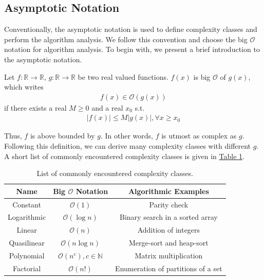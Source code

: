 \subsection{Asymptotic Notation}
Conventionally, the asymptotic notation is used to define complexity classes and perform the algorithm analysis. 
We follow this convention and choose the big $\mathcal{O}$ notation for algorithm analysis. To begin with, we present a brief
introduction to the asymptotic notation.
\begin{definition}
    Let $f: \mathbb{R} \rightarrow \mathbb{R}$, $g: \mathbb{R} \rightarrow \mathbb{R}$ be two real valued functions. 
    $f(x)$ is big $\mathcal{O}$ of $g(x)$, which writes
    \begin{align*}
        f(x) \in \mathcal{O}(g(x))
    \end{align*}
    if there exists a real $M \geq 0$ and a real $x_0$ s.t. 
    \begin{align*}
        |f(x)| \leq M |g(x)|, \forall x \geq x_0
    \end{align*}
\end{definition}
Thus, $f$ is above bounded by $g$. In other words, $f$ is utmost as complex as $g$. Following this definition, 
we can derive many complexity classes with different $g$. A short list of commonly encountered complexity classes is given 
in \hyperref[table:1]{Table 1}.
\begin{table}[H]
    \centering 
    \begin{tabular}{|| c | c | c ||}
        \hline 
        Name & Big $\mathcal{O}$ Notation & Algorithmic Examples \\ 
        \hline 
        Constant & $\mathcal{O}(1)$ & Parity check\\
        \hline 
        Logarithmic & $\mathcal{O}(\log n)$ & Binary search in a sorted array \\ 
        \hline 
        Linear & $\mathcal{O}(n)$ & Addition of integers \\
        \hline 
        Quasilinear & $\mathcal{O}(n\log n)$ & Merge-sort and heap-sort \\
        \hline 
        Polynomial & $\mathcal{O} (n^c), c \in \mathbb{N}$ & Matrix multiplication \\
        \hline 
        Factorial & $\mathcal{O} (n!)$ & Enumeration of partitions of a set\\
        \hline 
    \end{tabular}
    \caption{List of commonly encountered complexity classes.}
    \label{table:1}
\end{table}

